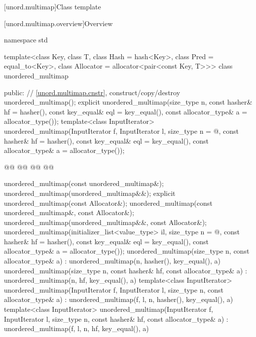 \documentclass{wg21}
\begin{document}
[unord.multimap]{Class template }%

[unord.multimap.overview]{Overview}

%
\begin{codeblock}
namespace std {
template<class Key,
class T,
class Hash = hash<Key>,
class Pred = equal_to<Key>,
class Allocator = allocator<pair<const Key, T>>>
class unordered_multimap {
    public:
    // \ref{unord.multimap.cnstr}, construct/copy/destroy
    unordered_multimap();
    explicit unordered_multimap(size_type n,
    const hasher& hf = hasher(),
    const key_equal& eql = key_equal(),
    const allocator_type& a = allocator_type());
    template<class InputIterator>
    unordered_multimap(InputIterator f, InputIterator l,
        size_type n = @\seebelow@,
        const hasher& hf = hasher(),
        const key_equal& eql = key_equal(),
        const allocator_type& a = allocator_type());

    @@
    @@
    @@
    @@

    unordered_multimap(const unordered_multimap&);
    unordered_multimap(unordered_multimap&&);
    explicit unordered_multimap(const Allocator&);
    unordered_multimap(const unordered_multimap&, const Allocator&);
    unordered_multimap(unordered_multimap&&, const Allocator&);
    unordered_multimap(initializer_list<value_type> il,
    size_type n = @\seebelow@,
    const hasher& hf = hasher(),
    const key_equal& eql = key_equal(),
    const allocator_type& a = allocator_type());
    unordered_multimap(size_type n, const allocator_type& a)
    : unordered_multimap(n, hasher(), key_equal(), a) { }
    unordered_multimap(size_type n, const hasher& hf, const allocator_type& a)
    : unordered_multimap(n, hf, key_equal(), a) { }
    template<class InputIterator>
    unordered_multimap(InputIterator f, InputIterator l, size_type n, const allocator_type& a)
    : unordered_multimap(f, l, n, hasher(), key_equal(), a) { }
    template<class InputIterator>
    unordered_multimap(InputIterator f, InputIterator l, size_type n, const hasher& hf,
    const allocator_type& a)
    : unordered_multimap(f, l, n, hf, key_equal(), a) { }

}}
\end{codeblock}
\end{document}
